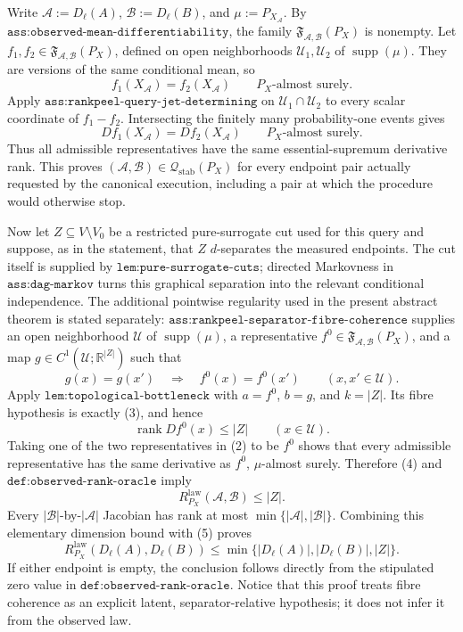 Write \(\mathcal A:=D_\ell(A)\), \(\mathcal B:=D_\ell(B)\), and \(\mu:=P_{X_{\mathcal A}}\).  By \(\texttt{ass:observed-mean-differentiability}\), the family \(\mathfrak F_{\mathcal A,\mathcal B}(P_X)\) is nonempty.  Let \(f_1,f_2\in\mathfrak F_{\mathcal A,\mathcal B}(P_X)\), defined on open neighborhoods \(\mathcal U_1,\mathcal U_2\) of \(\operatorname{supp}(\mu)\).  They are versions of the same conditional mean, so
\[
 f_1(X_{\mathcal A})=f_2(X_{\mathcal A})
 \qquad P_X\text{-almost surely}. \tag{1}
\]
Apply \(\texttt{ass:rankpeel-query-jet-determining}\) on \(\mathcal U_1\cap\mathcal U_2\) to every scalar coordinate of \(f_1-f_2\).  Intersecting the finitely many probability-one events gives
\[
 Df_1(X_{\mathcal A})=Df_2(X_{\mathcal A})
 \qquad P_X\text{-almost surely}. \tag{2}
\]
Thus all admissible representatives have the same essential-supremum derivative rank.  This proves \((\mathcal A,\mathcal B)\in\mathcal Q_{\mathrm{stab}}(P_X)\) for every endpoint pair actually requested by the canonical execution, including a pair at which the procedure would otherwise stop.

Now let \(Z\subseteq V\setminus V_0\) be a restricted pure-surrogate cut used for this query and suppose, as in the statement, that \(Z\) \(d\)-separates the measured endpoints.  The cut itself is supplied by \(\texttt{lem:pure-surrogate-cuts}\); directed Markovness in \(\texttt{ass:dag-markov}\) turns this graphical separation into the relevant conditional independence.  The additional pointwise regularity used in the present abstract theorem is stated separately: \(\texttt{ass:rankpeel-separator-fibre-coherence}\) supplies an open neighborhood \(\mathcal U\) of \(\operatorname{supp}(\mu)\), a representative \(f^0\in\mathfrak F_{\mathcal A,\mathcal B}(P_X)\), and a map \(g\in C^1(\mathcal U;\mathbb R^{|Z|})\) such that
\[
 g(x)=g(x')\quad\Longrightarrow\quad f^0(x)=f^0(x')
 \qquad(x,x'\in\mathcal U). \tag{3}
\]
Apply \(\texttt{lem:topological-bottleneck}\) with \(a=f^0\), \(b=g\), and \(k=|Z|\).  Its fibre hypothesis is exactly (3), and hence
\[
 \operatorname{rank}Df^0(x)\leq |Z|
 \qquad(x\in\mathcal U). \tag{4}
\]
Taking one of the two representatives in (2) to be \(f^0\) shows that every admissible representative has the same derivative as \(f^0\), \(\mu\)-almost surely.  Therefore (4) and \(\texttt{def:observed-rank-oracle}\) imply
\[
 R^{\mathrm{law}}_{P_X}(\mathcal A,\mathcal B)\leq |Z|. \tag{5}
\]
Every \(|\mathcal B|\)-by-\(|\mathcal A|\) Jacobian has rank at most \(\min\{|\mathcal A|,|\mathcal B|\}\).  Combining this elementary dimension bound with (5) proves
\[
 R^{\mathrm{law}}_{P_X}(D_\ell(A),D_\ell(B))
 \leq
 \min\{|D_\ell(A)|,|D_\ell(B)|,|Z|\}.
\]
If either endpoint is empty, the conclusion follows directly from the stipulated zero value in \(\texttt{def:observed-rank-oracle}\).  Notice that this proof treats fibre coherence as an explicit latent, separator-relative hypothesis; it does not infer it from the observed law.

